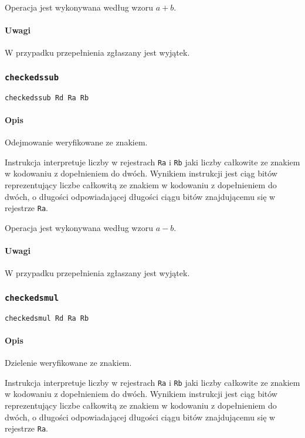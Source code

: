 Operacja jest wykonywana według wzoru $a + b$.

\paragraph*{Uwagi}

W przypadku przepełnienia zgłaszany jest wyjątek.

\subsubsection{\texttt{checkedssub}}

\begin{lstlisting}
checkedssub Rd Ra Rb
\end{lstlisting}

\paragraph*{Opis} Odejmowanie weryfikowane ze znakiem.

Instrukcja interpretuje liczby w rejestrach \texttt{Ra} i \texttt{Rb} jaki
liczby całkowite ze znakiem w kodowaniu z dopełnieniem do dwóch. Wynikiem
instrukcji jest ciąg bitów reprezentujący liczbe całkowitą ze znakiem w
kodowaniu z dopełnieniem do dwóch, o długości odpowiadającej długości ciągu
bitów znajdującemu się w rejestrze \texttt{Ra}.

Operacja jest wykonywana według wzoru $a - b$.

\paragraph*{Uwagi}

W przypadku przepełnienia zgłaszany jest wyjątek.

\subsubsection{\texttt{checkedsmul}}

\begin{lstlisting}
checkedsmul Rd Ra Rb
\end{lstlisting}

\paragraph*{Opis} Dzielenie weryfikowane ze znakiem.

Instrukcja interpretuje liczby w rejestrach \texttt{Ra} i \texttt{Rb} jaki
liczby całkowite ze znakiem w kodowaniu z dopełnieniem do dwóch. Wynikiem
instrukcji jest ciąg bitów reprezentujący liczbe całkowitą ze znakiem w
kodowaniu z dopełnieniem do dwóch, o długości odpowiadającej długości ciągu
bitów znajdującemu się w rejestrze \texttt{Ra}.

